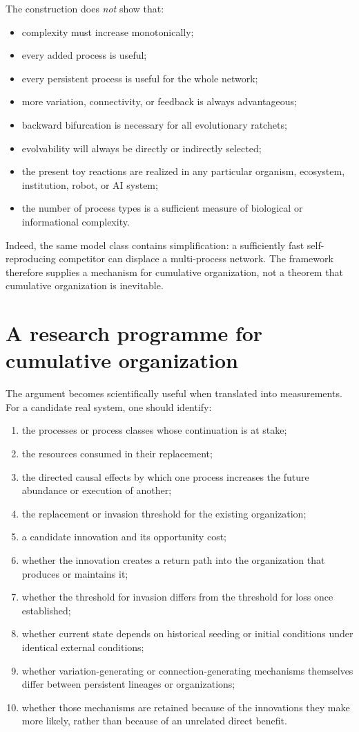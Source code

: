 \documentclass[11pt]{article}
\begin{document}
The construction does \emph{not} show that:
\begin{itemize}
\item complexity must increase monotonically;
\item every added process is useful;
\item every persistent process is useful for the whole network;
\item more variation, connectivity, or feedback is always advantageous;
\item backward bifurcation is necessary for all evolutionary ratchets;
\item evolvability will always be directly or indirectly selected;
\item the present toy reactions are realized in any particular organism, ecosystem, institution, robot, or AI system;
\item the number of process types is a sufficient measure of biological or informational complexity.
\end{itemize}

Indeed, the same model class contains simplification: a sufficiently fast self-reproducing competitor can displace a multi-process network. The framework therefore supplies a mechanism for cumulative organization, not a theorem that cumulative organization is inevitable.

\section{A research programme for cumulative organization}

The argument becomes scientifically useful when translated into measurements. For a candidate real system, one should identify:

\begin{enumerate}[label=\alph*)]
\item the processes or process classes whose continuation is at stake;
\item the resources consumed in their replacement;
\item the directed causal effects by which one process increases the future abundance or execution of another;
\item the replacement or invasion threshold for the existing organization;
\item a candidate innovation and its opportunity cost;
\item whether the innovation creates a return path into the organization that produces or maintains it;
\item whether the threshold for invasion differs from the threshold for loss once established;
\item whether current state depends on historical seeding or initial conditions under identical external conditions;
\item whether variation-generating or connection-generating mechanisms themselves differ between persistent lineages or organizations;
\item whether those mechanisms are retained because of the innovations they make more likely, rather than because of an unrelated direct benefit.
\end{enumerate}
\end{document}
